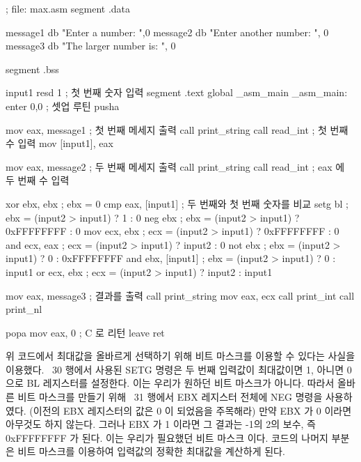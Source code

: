 \begin{AsmCodeListing}
; file: max.asm
segment .data

message1 db "Enter a number: ",0
message2 db "Enter another number: ", 0
message3 db "The larger number is: ", 0

segment .bss

input1  resd    1        ; 첫 번째 숫자 입력
segment .text
        global  _asm_main
_asm_main:
        enter   0,0               ; 셋업 루틴
        pusha

        mov     eax, message1     ; 첫 번째 메세지 출력
        call    print_string
        call    read_int          ; 첫 번째 수 입력 
        mov     [input1], eax

        mov     eax, message2     ; 두 번째 메세지 출력
        call    print_string
        call    read_int          ; eax 에 두 번째 수 입력

        xor     ebx, ebx          ; ebx = 0
        cmp     eax, [input1]     ; 두 번째와 첫 번째 숫자를 비교
        setg    bl                ; ebx = (input2 > input1) ?          1 : 0
        neg     ebx               ; ebx = (input2 > input1) ? 0xFFFFFFFF : 0
        mov     ecx, ebx          ; ecx = (input2 > input1) ? 0xFFFFFFFF : 0
        and     ecx, eax          ; ecx = (input2 > input1) ?     input2 : 0
        not     ebx               ; ebx = (input2 > input1) ?          0 : 0xFFFFFFFF
        and     ebx, [input1]     ; ebx = (input2 > input1) ?          0 : input1
        or      ecx, ebx          ; ecx = (input2 > input1) ?     input2 : input1

        mov     eax, message3     ; 결과를 출력
        call    print_string
        mov     eax, ecx
        call    print_int
        call    print_nl

        popa
        mov     eax, 0            ; C 로 리턴
        leave                     
        ret
\end{AsmCodeListing}

위 코드에서 최대값을 올바르게 선택하기 위해 비트 마스크를 이용할 수 있다는 사실을 이용했다. 
~30 행에서 사용된 {\code SETG} 명령은 두 번째 입력값이
최대값이면 1, 아니면 0 으로 BL 레지스터를 설정한다. 이는 우리가 원하던
비트 마스크가 아니다. 따라서 올바른 비트 마스크를 만들기 위해 ~31 행에서
EBX 레지스터 전체에 {\code NEG} 명령을 사용하였다. (이전의 EBX
레지스터의 값은 0 이 되었음을 주목해라) 만약 EBX 가 0 이라면 아무것도 하지 
않는다. 그러나 EBX 가 1 이라면 그 결과는 -1의 2의 보수, 즉 0xFFFFFFFF 가 된다. 이는 
우리가 필요했던 비트 마스크 이다. 코드의 나머지 부분은 비트 마스크를 이용하여 
입력값의 정확한 최대값을 계산하게 된다. 

